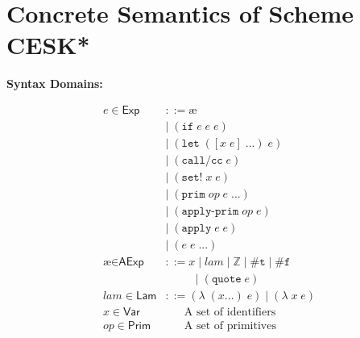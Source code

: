 \documentclass[12pt,draft]{article}
\newcommand\mae{\ensuremath{\text{\ae}}}
\newcommand{\lamsyn}[2]{(\lambda\;(#1 ...)\;#2)}
\newcommand{\vararglamsyn}[2]{(\lambda\;#1\;#2)}
\newcommand{\letsyn}[3]{(\texttt{let}\;([#1\;#2]\;...)\;#3)}
\newcommand{\ifsyn}[3]{(\texttt{if}\;#1\;#2\;#3)}
\newcommand{\primsyn}[2]{(\texttt{prim}\;#1\;#2\;...)}
\newcommand{\applyprimsyn}[2]{(\texttt{apply-prim}\;#1\;#2)}
\newcommand{\applysyn}[2]{(\texttt{apply}\;#1\;#2)}
\newcommand{\callccsyn}[1]{(\texttt{call/cc}\;#1)}
\newcommand{\setsyn}[2]{(\texttt{set!}\;#1\;#2)}
\newcommand{\quotesyn}[1]{(\texttt{quote}\;#1)}
\newcommand{\truesyn}{\texttt{\#t}}
\newcommand{\falsesyn}{\texttt{\#f}}
\begin{document}


\section{Concrete Semantics of Scheme CESK*}

\small{
\begin{multicols*}{2}
\begin{center}
\textbf{Syntax Domains:}
\end{center}
\vspace{-18mm}
\begin{center}
\begin{align*}
e \in \textsf{Exp} &::= \mae \\
				&|\; \ifsyn{e}{e}{e} \\
				&|\; \letsyn{x}{e}{e} \\
				&|\; \callccsyn{e} \\
				&|\; \setsyn{x}{e} \\
				&|\; \primsyn{op}{e} \\
				&|\; \applyprimsyn{op}{e} \\
				&|\; \applysyn{e}{e} \\
				&|\; (e\;e\;...) \\
\mae \in \textsf{AExp} &::= x\;|\; lam\;|\; \mathbb{Z}
							\;|\; \truesyn \;|\; \falsesyn \\
				&\;\;\;\;\;\;\;\;\;\, |\; \quotesyn{e} \\
lam \in \textsf{Lam} &::= \lamsyn{x}{e} \;|\; \vararglamsyn{x}{e} \\
x \in \textsf{Var}   &\;\;\;\;\;\; \text{A set of identifiers} \\
op \in \textsf{Prim} &\;\;\;\;\;\; \text{A set of primitives}
\end{align*}

\end{center}
\end{multicols*}}
\end{document}
